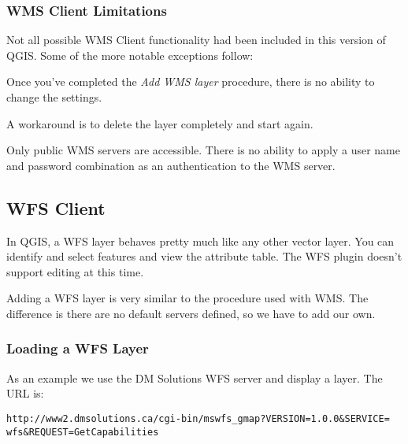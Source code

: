 \subsubsection{WMS Client Limitations}\label{sec:ogc-wms-limits}

Not all possible WMS Client functionality had been included in this version of QGIS.
Some of the more notable exceptions follow:


Once you've completed the \textsl{Add WMS layer}
procedure, there is no ability to change the settings.

A workaround is to delete the layer completely and start again.


Only public WMS servers are accessible.
There is no ability to apply a user name and password combination
as an authentication to the WMS server.

\subsection{WFS Client}

In QGIS, a WFS layer behaves pretty much like any other vector layer. You 
can identify and select features and view the attribute table. The WFS 
plugin doesn't support editing at this time. 

Adding a WFS layer is very similar to the procedure used with WMS. The
difference is there are no default servers defined, so we have to add our
own.

\subsubsection{Loading a WFS Layer}

As an example we use the DM Solutions WFS server and display a layer. The URL is:
\begin{verbatim}
http://www2.dmsolutions.ca/cgi-bin/mswfs_gmap?VERSION=1.0.0&SERVICE=
wfs&REQUEST=GetCapabilities
\end{verbatim}

